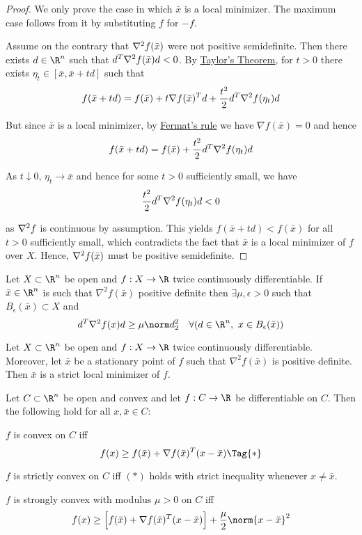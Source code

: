 \begin{proof}
  \def\x{\bar x}
  \def\H#1{\nabla^2f\ifx&#1&\else(#1)\fi}
  \def\G{\nabla f(\x)}
  We only prove the case in which $\x$ is a local minimizer. The maximum case
  follows from it by substituting $f$ for $-f$.

  Assume on the contrary that $\H\x$ were not positive semidefinite. Then there
  exists $d\in\R^n$ such that $d^T\H\x d<0$. By \href{b90111f}{Taylor's Theorem},
  for $t>0$ there exists $\eta_t\in[\x,\x+td]$ such that
  $$
    f(\x+td)=f(\x)+t\G^Td+\frac{t^2}2d^T\H{\eta_t}d
  $$

  But since $\x$ is a local minimizer, by \href{dc165c9}{Fermat's rule} we have
  $\G=0$ and hence
  $$
    f(\x+td)=f(\x)+\frac{t^2}2d^T\H{\eta_t}d
  $$

  As $t\downarrow0$, $\eta_t\to\x$ and hence for some $t>0$ sufficiently small,
  we have
  $$
    \frac{t^2}2d^T\H{\eta_t}d<0
  $$

  as $\H{}$ is continuous by assumption. This yields $f(\x+td)<f(\x)$ for all
  $t>0$ sufficiently small, which contradicts the fact that $\x$ is a local
  minimizer of $f$ over $X$. Hence, $\H\x$ must be positive semidefinite.
\end{proof}

\label{eaa0d24}

Let $X\subset\R^n$ be open and $f:X\to\R$ twice continuously differentiable. If
$\bar x\in\R^n$ is such that $\nabla^2f(\bar x)$ positive definite then
$\exists\mu,\epsilon>0$ such that $B_\epsilon(\bar x)\subset X$ and
$$
  d^T\nabla^2f(x)d\geq\mu\norm d^2_2\quad\forall(d\in\R^n,\
  x\in B_\epsilon(\bar x))
$$

\label{b43d95d}

Let $X\subset\R^n$ be open and $f:X\to\R$ twice continuously differentiable.
Moreover, let $\bar x$ be a stationary point of $f$ such that $\nabla^2f(\bar
x)$ is positive definite. Then $\bar x$ is a strict local minimizer of $f$.

\label{cd9cea7}

Let $C\subset\R^n$ be open and convex and let $f:C\to\R$ be differentiable on
$C$. Then the following hold for all $x,\bar x\in C$:
\begin{enumerata}
  \item $f$ is convex on $C$ iff
  \begin{equation*}
    f(x)\geq f(\bar x)+\nabla f(\bar x)^T(x-\bar x)\Tag{*}
  \end{equation*}
  \item $f$ is strictly convex on $C$ iff $(*)$ holds with strict
  inequality whenever $x\neq\bar x$.
  \item $f$ is strongly convex with modulus $\mu>0$ on $C$ iff
  $$
    f(x)\geq\Big[f(\bar x)+\nabla f(\bar x)^T(x-\bar x)\Big]
    +\frac\mu2\norm{x-\bar x}^2
  $$
\end{enumerata}

